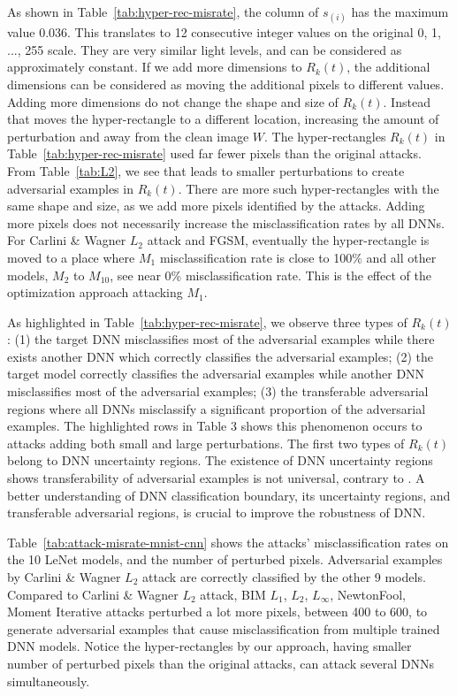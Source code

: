 \documentclass[12pt]{article}
\begin{document}
As shown in Table~\ref{tab:hyper-rec-misrate}, the column of $s_{(i)}$
has the maximum value 0.036. This 
translates to 12 consecutive integer values on the original 0, 1, ...,
255 scale. They are very similar light levels, and can be considered as
approximately constant. If we
add more dimensions to $R_k(t)$, the additional dimensions can be considered as
moving the additional pixels to different values. Adding more dimensions do not
change the shape and size of $R_k(t)$. Instead that 
moves the hyper-rectangle to a different location, increasing the
amount of perturbation and away from the clean image $W$. 
The hyper-rectangles $R_k(t)$ in Table~\ref{tab:hyper-rec-misrate}
used far fewer pixels than the original attacks. From
Table~\ref{tab:L2}, we see that leads to smaller perturbations
to create adversarial examples in $R_k(t)$. There are more
such hyper-rectangles with the same shape and size, as we add more
pixels identified by the attacks. 
Adding more pixels does not necessarily increase the misclassification
rates by all DNNs. For Carlini \& Wagner $L_2$ attack
and FGSM, eventually the hyper-rectangle is moved to a place where $M_1$
misclassification rate is close to 100\% and all other models, $M_2$ to
$M_{10}$, see near 0\% misclassification rate. This is the effect of
the optimization approach attacking $M_1$.

As highlighted in Table~\ref{tab:hyper-rec-misrate},
we observe three types of $R_k(t)$:
(1) the target DNN misclassifies most of the adversarial
examples while  there exists another DNN which correctly classifies the
adversarial examples; (2) the target model correctly classifies the
adversarial examples while another DNN misclassifies most of the
adversarial examples; (3) the transferable adversarial regions where
all DNNs misclassify a significant proportion of the adversarial
examples. The highlighted rows in Table 3 shows this phenomenon occurs
to attacks adding both small and large perturbations.
The first two types of $R_k(t)$ belong to DNN uncertainty
regions. The existence of DNN uncertainty regions 
shows transferability of adversarial examples is not universal, contrary to
\cite{attack-LBFGS,explain-adexample-2015,transferable-adexample-space-2017}.
A better understanding of DNN classification boundary, its 
uncertainty regions, and transferable adversarial regions, is crucial
to improve the robustness of DNN.  
 
Table~\ref{tab:attack-misrate-mnist-cnn} shows the attacks'
misclassification rates on the 10 LeNet models, and the number of perturbed
pixels. Adversarial examples by Carlini \& Wagner $L_2$ attack are
correctly classified by the other 9 models. 
Compared to Carlini \& Wagner $L_2$ attack, BIM $L_1$, $L_2$,
$L_{\infty}$, NewtonFool, Moment Iterative attacks perturbed a lot more
pixels, between 400 to 600, to generate adversarial examples that cause
misclassification from multiple trained DNN models.  
Notice the hyper-rectangles by our approach, having smaller
number of perturbed pixels than the original attacks, can attack
several DNNs simultaneously. 
\end{document}
